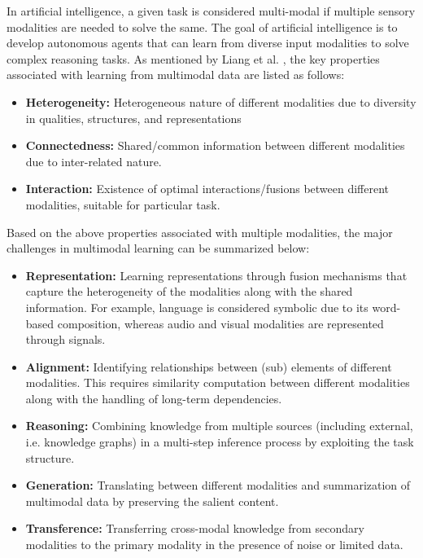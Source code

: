 In artificial intelligence, a given task is considered multi-modal if multiple sensory modalities are needed to solve the same. The goal of artificial intelligence is to develop autonomous agents that can learn from diverse input modalities to solve complex reasoning tasks. As mentioned by Liang et al. \cite{Liang2022FoundationsAR}, the key properties associated with learning from multimodal data are listed as follows:
\begin{itemize}
    \item \textbf{Heterogeneity:} Heterogeneous nature of different modalities due to diversity in qualities, structures, and representations
    \item \textbf{Connectedness:} Shared/common information between different modalities due to inter-related nature.
    \item \textbf{Interaction:} Existence of optimal interactions/fusions between different modalities, suitable for particular task.
\end{itemize}
Based on the above properties associated with multiple modalities, the major challenges in multimodal learning \cite{Liang2022FoundationsAR} can be summarized below:

\begin{itemize}
    \item \textbf{Representation:} Learning representations through fusion mechanisms that capture the heterogeneity of the modalities along with the shared information. For example, language is considered symbolic due to its word-based composition, whereas audio and visual modalities are represented through signals.
    \item \textbf{Alignment:} Identifying relationships between (sub) elements of different modalities. This requires similarity computation between different modalities along with the handling of long-term dependencies.
    \item \textbf{Reasoning:} Combining knowledge from multiple sources (including external, i.e. knowledge graphs) in a multi-step inference process by exploiting the task structure.
    \item \textbf{Generation:} Translating between different modalities and summarization of multimodal data by preserving the salient content.
    \item \textbf{Transference:} Transferring cross-modal knowledge from secondary modalities to the primary modality in the presence of noise or limited data.
\end{itemize}

